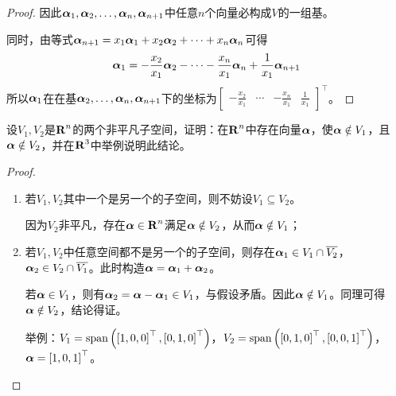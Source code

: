 \begin{proof}
    因此\({\boldsymbol{\alpha}}_1,{\boldsymbol{\alpha}}_2,\dots,{\boldsymbol{\alpha}}_{n},\boldsymbol{\alpha}_{n+1}\)中任意\(n\)个向量必构成\(V\)的一组基。

    同时，由等式\(\boldsymbol{\alpha}_{n+1}=x_1\boldsymbol{\alpha}_1+x_2\boldsymbol{\alpha}_2+\cdots+x_n\boldsymbol{\alpha}_n\)可得
    \begin{equation*}
        \boldsymbol{\alpha}_1=-\frac{x_2}{x_1}\boldsymbol{\alpha}_2-\cdots-\frac{x_n}{x_1}\boldsymbol{\alpha}_n+\frac{1}{x_1}\boldsymbol{\alpha}_{n+1}
    \end{equation*}
    所以\(\boldsymbol{\alpha}_1\)在在基\(\boldsymbol{\alpha}_2,\dots,\boldsymbol{\alpha}_n,\boldsymbol{\alpha}_{n+1}\)下的坐标为\(\begin{bmatrix}-\frac{x_2}{x_1}&\cdots&-\frac{x_n}{x_1}&\frac{1}{x_1}\end{bmatrix}^\top\)。

\end{proof}

\setcounter{problem}{11}
\begin{problem}
设\(V_1,V_2\)是\(\boldsymbol{\mathrm{R}}^n\)的两个非平凡子空间，证明：在\(\boldsymbol{\mathrm{R}}^n\)中存在向量\(\boldsymbol{\alpha}\)，使\(\boldsymbol{\alpha}\notin V_1\)，且\(\boldsymbol{\alpha}\notin V_2\)，并在\(\boldsymbol{\mathrm{R}}^3\)中举例说明此结论。
\end{problem}
\begin{proof}
    \begin{enumerate}
        \item {
              若\(V_1,V_2\)其中一个是另一个的子空间，则不妨设\(V_1\subseteq V_2\)。

              因为\(V_2\)非平凡，存在\(\boldsymbol{\alpha}\in\boldsymbol{\mathrm{R}}^n\)满足\(\boldsymbol{\alpha}\notin V_2\)，从而\(\boldsymbol{\alpha}\notin V_1\)；
              }
        \item {
              若\(V_1,V_2\)中任意空间都不是另一个的子空间，则存在\(\boldsymbol{\alpha}_1\in V_1\cap\overline{V_2}\)，\(\boldsymbol{\alpha}_2\in V_2\cap\overline{V_1}\)。此时构造\(\boldsymbol{\alpha}=\boldsymbol{\alpha}_1+\boldsymbol{\alpha}_2\)。

              若\(\boldsymbol{\alpha}\in V_1\)，则有\(\boldsymbol{\alpha}_2=\boldsymbol{\alpha}-\boldsymbol{\alpha}_1\in V_1\)，与假设矛盾。因此\(\boldsymbol{\alpha}\notin V_1\)。同理可得\(\boldsymbol{\alpha}\notin V_2\)，结论得证。

              举例：\(V_1=\mathrm{span}\left( \left[ 1,0,0 \right]^\top,\left[ 0,1,0 \right]^\top \right)\)，\(V_2=\mathrm{span}\left( \left[ 0,1,0 \right]^\top,\left[ 0,0,1 \right]^\top \right)\)，\(\boldsymbol{\alpha}=\left[ 1,0,1 \right]^\top\)。
              }
    \end{enumerate}
\end{proof}

